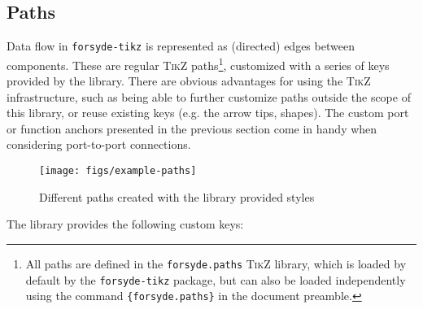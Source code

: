 \subsection{Paths}

Data flow in \texttt{forsyde-tikz} is represented as (directed) edges between components. These are regular \textsc{TikZ} paths\footnote{All paths are defined in the \texttt{forsyde.paths} \textsc{TikZ} library, which is loaded by default by the \texttt{forsyde-tikz} package, but can also be loaded independently using the command \texttt{\string\usetikzlibrary\{forsyde.paths\}} in the document preamble.}, customized with a series of keys provided by the library. There are obvious advantages for using the \textsc{TikZ} infrastructure, such as being able to further customize paths outside the scope of this library, or reuse existing keys (e.g. the arrow tips, shapes). The custom port or function anchors presented in the previous section come in handy when considering port-to-port connections. 


\begin{figure}[htb]\centering
\texttt{[image: figs/example-paths]}

\caption{Different paths created with the library provided styles}
\end{figure}

The library provides the following custom keys:

